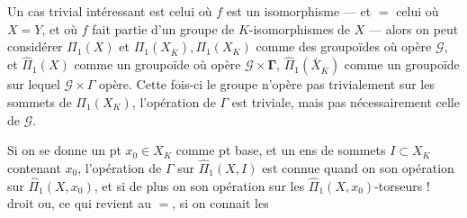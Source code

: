 Un cas trivial intéressant est celui où $f$ est un isomorphisme --- et $=$ celui où $X=Y$, et où $f$ fait partie d'un groupe  de $K$-isomorphismes de $X$ --- alors on peut considérer $\Pi_1(X)$ et $\Pi_1(X_{\bar K}),\Pi_1(X_K)$ comme des groupoïdes où opère $\mathcal G$, et $\widehat\Pi_1(X)$ comme un groupoïde où opère $\mathcal G\times\mathbf{\Gamma}$, $\widehat\Pi_1(\bar X_{\bar K})$ comme un groupoïde sur lequel $\mathcal G\times\Gamma$ opère. Cette fois-ci le groupe n'opère pas trivialement sur les sommets de $\Pi_1(X_K)$, l'opération de $\Gamma$ est triviale, mais pas nécessairement celle de $\mathcal G$.

Si on se donne un pt $x_0\in X_K$ comme pt base, et un ens de sommets $I\subset X_K$ contenant $x_0$, l'opération de $\Gamma$ sur $\widehat\Pi_1(X,I)$ est connue quand on  son opération sur $\widehat\Pi_1(X,x_0)$, et si de plus on  son opération sur les $\widehat\Pi_1(X,x_0)$-torseurs ! droit
ou, ce qui revient au $=$, si on connait les
